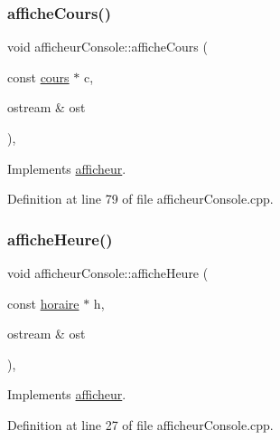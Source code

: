 \subsubsection{\texorpdfstring{affiche\+Cours()}{afficheCours()}}
{\footnotesize\ttfamily void afficheur\+Console\+::affiche\+Cours (\begin{DoxyParamCaption}\item[{const \hyperlink{classcours}{cours} $\ast$}]{c,  }\item[{ostream \&}]{ost }\end{DoxyParamCaption})\hspace{0.3cm}{\ttfamily [override]}, {\ttfamily [virtual]}}



Implements \hyperlink{classafficheur_a9d176576ad45c2a07a8a887b853b7edb}{afficheur}.



Definition at line 79 of file afficheur\+Console.\+cpp.

\hypertarget{classafficheur_console_a842884a9553df737f781d2f8f040d30e}{}\label{classafficheur_console_a842884a9553df737f781d2f8f040d30e} 
\subsubsection{\texorpdfstring{affiche\+Heure()}{afficheHeure()}}
{\footnotesize\ttfamily void afficheur\+Console\+::affiche\+Heure (\begin{DoxyParamCaption}\item[{const \hyperlink{classhoraire}{horaire} $\ast$}]{h,  }\item[{ostream \&}]{ost }\end{DoxyParamCaption})\hspace{0.3cm}{\ttfamily [override]}, {\ttfamily [virtual]}}



Implements \hyperlink{classafficheur_a3c3ace0f2f01e95a1cc86a0b6c497e34}{afficheur}.



Definition at line 27 of file afficheur\+Console.\+cpp.

